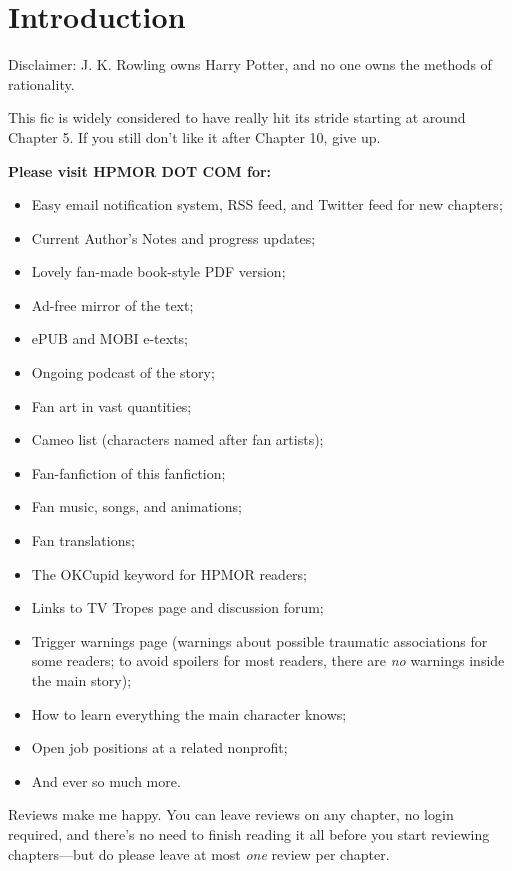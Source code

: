 \chapter{Introduction}
Disclaimer: J. K. Rowling owns Harry Potter, and no one owns the methods of
rationality.

This fic is widely considered to have really hit its stride starting at around
Chapter 5. If you still don't like it after Chapter 10, give up.

\bigskip
\textbf{Please visit HPMOR DOT COM for:}
\begin{itemize}\tightlist
    \item Easy email notification system, RSS feed, and Twitter feed for new chapters;
    \item Current Author's Notes and progress updates;
    \item Lovely fan-made book-style PDF version;
    \item Ad-free mirror of the text;
    \item ePUB and MOBI e-texts;
    \item Ongoing podcast of the story;
    \item Fan art in vast quantities;
    \item Cameo list (characters named after fan artists);
    \item Fan-fanfiction of this fanfiction;
    \item Fan music, songs, and animations;
    \item Fan translations;
    \item The OKCupid keyword for HPMOR readers;
    \item Links to TV Tropes page and discussion forum;
    \item Trigger warnings page (warnings about possible traumatic associations
        for some readers; to avoid spoilers for most readers, there are
        \emph{no} warnings inside the main story);
    \item How to learn everything the main character knows;
    \item Open job positions at a related nonprofit;
    \item And ever so much more.
\end{itemize}

Reviews make me happy. You can leave reviews on any chapter, no login required,
and there's no need to finish reading it all before you start reviewing
chapters---but do please leave at most \emph{one} review per chapter.

